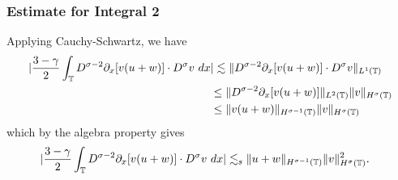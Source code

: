 \subsubsection{Estimate for Integral 2}
Applying Cauchy-Schwartz, we have 
\begin{equation*}
\begin{split}
|\frac{3-\gamma}{2} \int_{\mathbb{T}}  D^{\sigma -2}
\partial_x[v(u+w)] \cdot
D^\sigma v \ dx& | \lesssim  \|D^{\sigma -2}
\partial_x [v(u+w)] \cdot D^\sigma
v  \|_{L^1(\mathbb{T})}
\\
& \le   \|D^{\sigma -2} \partial_x [v(u+w)]
\|_{L^2(\mathbb{T})} \|v\|_{H^\sigma(\mathbb{T})}
\\
& \le \|v(u+w)\|_{H^{\sigma -1}(\mathbb{T})} \|v\|_{H^\sigma(\mathbb{T})}
\end{split}
\end{equation*}
which by the algebra property gives
\begin{equation}
\begin{split}
    |\frac{3-\gamma}{2} \int_{\mathbb{T}}  D^{\sigma -2}
\partial_x[v(u+w)] \cdot
D^\sigma v \ dx& |  \lesssim_{s} \|u+w\|_{H^{\sigma -1}(\mathbb{T})} \|v\|_{H^\sigma(\mathbb{T})}^2.
\label{3v}
\end{split}
\end{equation}
